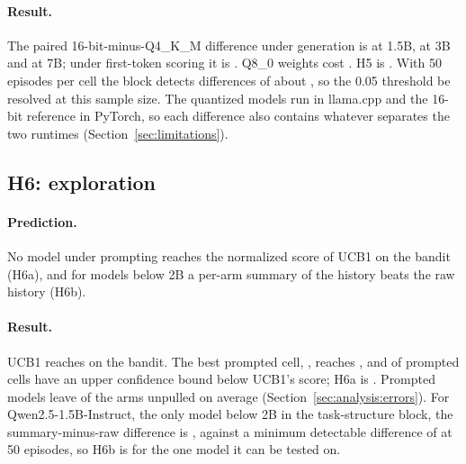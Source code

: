 \paragraph{Result.} The paired 16-bit-minus-Q4\_K\_M difference under generation is  at 1.5B,  at 3B and  at 7B; under first-token scoring it is . Q8\_0 weights cost . H5 is . With 50 episodes per cell the block detects differences of about , so the 0.05 threshold  be resolved at this sample size. The quantized models run in llama.cpp and the 16-bit reference in PyTorch, so each difference also contains whatever separates the two runtimes (Section~\ref{sec:limitations}). 

\subsection{H6: exploration}
\label{sec:res:h6}

\paragraph{Prediction.} No model under prompting reaches the normalized score of UCB1 on the bandit (H6a), and for models below 2B a per-arm summary of the history beats the raw history (H6b).

\paragraph{Result.} UCB1 reaches  on the bandit. The best prompted cell, , reaches , and \result{[number]} of \result{[number]} prompted cells have an upper confidence bound below UCB1's score; H6a is . Prompted models leave \result{[fraction]} of the arms unpulled on average (Section~\ref{sec:analysis:errors}). For Qwen2.5-1.5B-Instruct, the only model below 2B in the task-structure block, the summary-minus-raw difference is , against a minimum detectable difference of \result{[value]} at 50 episodes, so H6b is  for the one model it can be tested on. 

